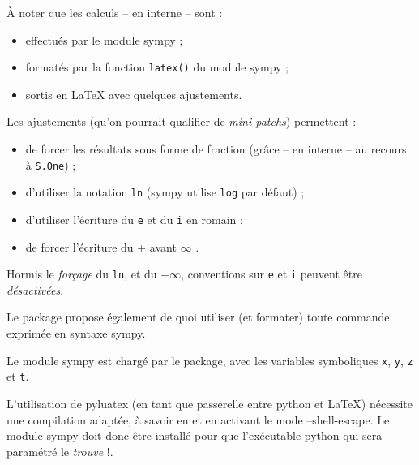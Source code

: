 \documentclass[french,a4paper,11pt]{article}
\begin{document}
\begin{importantblock}
À noter que les calculs -- en interne -- sont :

\begin{itemize}
	\item effectués par le module \textsf{sympy} ;
	\item formatés par la fonction \texttt{latex()} du module \textsf{sympy} ;
	\item sortis en \LaTeX{} avec quelques ajustements.
\end{itemize}

Les ajustements (qu'on pourrait qualifier de \textit{mini-patchs}) permettent :

\begin{itemize}
	\item de forcer les résultats sous forme de fraction (grâce -- en interne -- au recours à \texttt{S.One}) ;
	\item d'utiliser la notation \texttt{ln} (\textsf{sympy} utilise \texttt{log} par défaut) ;
	\item d'utiliser l'écriture du \texttt{e} et du \texttt{i} en \textsf{romain} ;
	\item de forcer l'écriture du \og + \fg{} avant \og $\infty$ \fg.
\end{itemize}

Hormis le \textit{forçage} du \texttt{ln}, et du $\mathtt{+\infty}$, conventions sur \texttt{e} et \texttt{i} peuvent être \textit{désactivées}.
\end{importantblock}

\begin{tipblock}
Le package propose également de quoi utiliser (et formater) toute commande exprimée en syntaxe \textsf{sympy}.

\smallskip

Le module \textsf{sympy} est chargé par le package, avec les variables symboliques \texttt{x}, \texttt{y}, \texttt{z} et \texttt{t}.
\end{tipblock}

\begin{warningblock}
L'utilisation de \textsf{pyluatex} (en tant que passerelle entre \textsf{python} et \LaTeX) nécessite une compilation adaptée, à savoir en  et en activant le mode \textsf{--shell-escape}. Le module \textsf{sympy} doit donc être installé pour que l'exécutable \textsf{python} qui sera paramétré le \textit{trouve} !.
\end{warningblock}
\end{document}
